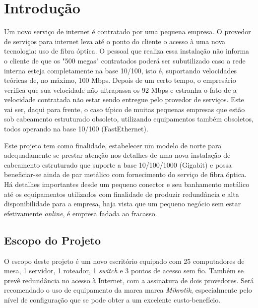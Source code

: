 \documentclass[	DIV=calc,%
							paper=a4,%
							fontsize=12pt,%
							onecolumn]{scrartcl}	 					%
\begin{document}
\clearpage
\renewcommand{\contentsname}{Sumário}
\tableofcontents
\clearpage

\section{Introdução}

Um novo serviço de internet é contratado por uma pequena empresa. O provedor de serviços para internet leva até o ponto do cliente o acesso à uma nova tecnologia: uso de fibra óptica. O pessoal que realiza essa instalação não informa o cliente de que os "500 megas" contratados poderá ser subutilizado caso a rede interna esteja completamente na base 10/100, isto é, suportando velocidades teóricas de, no máximo, 100 Mbps. Depois de um certo tempo, o empresário verifica que sua velocidade não ultrapassa os 92 Mbps e estranha o fato de a velocidade contratada não estar sendo entregue pelo provedor de serviços. Este vai ser, daqui para frente, o caso típico de muitas pequenas empresas que estão sob cabeamento estruturado obsoleto, utilizando equipamentos também obsoletos, todos operando na base 10/100 (FastEthernet).
\bigskip

Este projeto tem como finalidade, estabelecer um modelo de norte para adequadamente se prestar atenção nos detalhes de uma nova instalação de cabeamento estruturado que suporte a base 10/100/1000 (Gigabit) e possa beneficiar-se ainda de par metálico com fornecimento do serviço de fibra óptica. Há detalhes importantes desde um pequeno conector e seu banhamento metálico até os equipamentos utilizados com finalidade de produzir redundância e alta disponibilidade para a empresa, haja vista que um pequeno negócio sem estar efetivamente \textit{online}, é empresa fadada ao fracasso.
\bigskip

\subsection{Escopo do Projeto}
O escopo deste projeto é um novo escritório equipado com 25 computadores de mesa, 1 servidor, 1 roteador, 1 \textit{switch} e 3 pontos de acesso sem fio. Também se prevê redundância no acesso à Internet, com a assinatura de dois provedores. Será recomendado o uso de equipamento da marca marca \textit{Mikrotik}, especialmente pelo nível de configuração que se pode obter a um excelente custo-benefício. 
\end{document}
